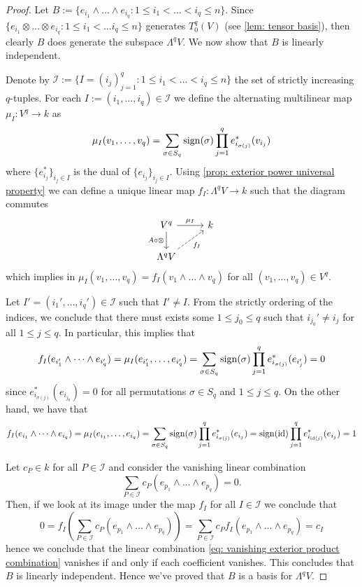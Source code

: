 \begin{proof}
  Let \(B := \{e_{i_1} \wedge \dots \wedge e_{i_q} : 1 \leq i_1 < \dots < i_q
  \leq n\}\). Since \(\{e_{i_1} \otimes \dots \otimes e_{i_q} : 1 \leq i_1 <
  \dots i_q \leq n\}\) generates \(T_0^q(V)\) (see \cref{lem: tensor basis}),
  then clearly \(B\) does generate the subspace \(\Lambda^q V\). We now show
  that \(B\) is linearly independent.

  Denote by \(\mathcal I := \{I = (i_j)_{j=1}^q : 1 \leq i_1 < \dots < i_q \leq
  n\}\) the set of strictly increasing \(q\)-tuples. For each \(I := (i_1,
  \dots, i_q) \in \mathcal I\) we define the alternating multilinear map \(\mu_I
  : V^q \to k\) as
  \[
    \mu_I(v_1, \dots, v_q) = \sum_{\sigma \in S_q}
    \operatorname{sign}(\sigma) \prod_{j=1}^q e_{i_{\sigma(j)}}^*(v_{i_j})
  \]
  where \(\{e_{i_j}^*\}_{i_j \in I}\) is the dual of \(\{e_{i_j}\}_{i_j
  \in I}\). Using \cref{prop: exterior power universal property} we can
  define a unique linear map \(f_I: \Lambda^q V \to k\) such that the diagram
  commutes
  \[
    \begin{tikzcd}
      V^q \ar[r, "\mu_I"] \ar[d, swap, "A \circ \otimes"] &k \\
      \Lambda^q V \ar[ur, dashed, swap, "f_I"]
    \end{tikzcd}
  \]
  which implies in \(\mu_I(v_1, \dots, v_q) = f_I(v_1 \wedge \dots \wedge v_q)\)
  for all \((v_1, \dots, v_q) \in V^q\).

  Let \(I' = (i_1', \dots, i_q') \in \mathcal I\) such that \(I' \neq I\). From
  the strictly ordering of the indices, we conclude that there must exists some
  \(1 \leq j_0 \leq q\) such that \(i_{j_0}' \neq i_j\) for all \(1 \leq j \leq
  q\). In particular, this implies that
  \[
    f_I(e_{i_1'} \wedge \dots \wedge e_{i_q'}) = \mu_I(e_{i_1'}, \dots,
    e_{i_q'}) = \sum_{\sigma \in S_q} \operatorname{sign}(\sigma)
    \prod_{j=1}^q e_{i_{\sigma(j)}}^*(e_{i_j'}) = 0
  \]
  since \(e_{i_{\sigma(j)}}^*(e_{i_{j_0}}) = 0\) for all permutations \(\sigma
  \in S_q\) and \(1 \leq j \leq q\). On the other hand, we have that
  \[
    f_I(e_{i_1} \wedge \dots \wedge e_{i_q}) = \mu_I(e_{i_1}, \dots, e_{i_q})
    = \sum_{\sigma \in S_q} \operatorname{sign}(\sigma) \prod_{j=1}^q
    e_{i_{\sigma(j)}}^*(e_{i_j})
    = \operatorname{sign}(\operatorname{id}) \prod_{j=1}^q e_{i_{\operatorname{id}(j)}}^*(e_{i_j})
    = 1
  \]

  Let \(c_P \in k\) for all \(P \in \mathcal I\) and consider the vanishing
  linear combination
  \begin{equation}\label{eq: vanishing exterior product combination}
    \sum_{P \in \mathcal I} c_P (e_{p_1} \wedge \dots \wedge e_{p_q}) = 0.
  \end{equation}
  Then, if we look at its image under the map \(f_I\) for all \(I \in \mathcal
  I\) we conclude that
  \[
    0 = f_I\left( \sum_{P \in \mathcal I} c_P (e_{p_1} \wedge \dots \wedge
    e_{p_q}) \right) = \sum_{P \in \mathcal I} c_P f_I(e_{p_1} \wedge \dots \wedge
    e_{p_q}) = c_I
  \]
  hence we conclude that the linear combination \cref{eq: vanishing exterior
  product combination} vanishes if and only if each coefficient vanishes. This
  concludes that \(B\) is linearly independent. Hence we've proved that \(B\) is
  a basis for \(\Lambda^q V\).
\end{proof}

